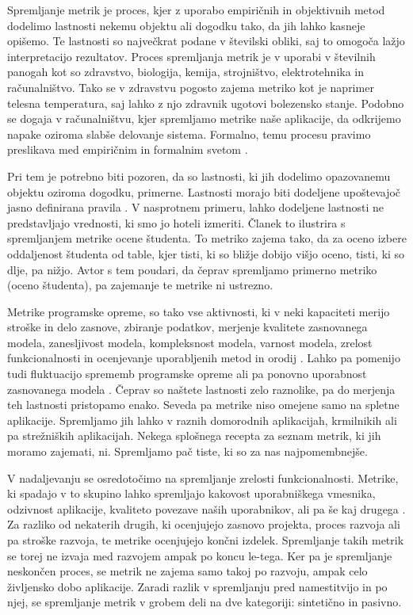 \documentclass[a4paper, 12pt]{book}
\begin{document}
Spremljanje metrik je proces, kjer z uporabo empiričnih in objektivnih metod dodelimo lastnosti nekemu objektu ali dogodku tako, da jih lahko kasneje opišemo. Te lastnosti so največkrat podane v številski obliki, saj to omogoča lažjo interpretacijo rezultatov. Proces spremljanja metrik je v uporabi v številnih panogah kot so zdravstvo, biologija, kemija, strojništvo, elektrotehnika in računalništvo. Tako se v zdravstvu pogosto zajema metriko kot je naprimer telesna temperatura, saj lahko z njo zdravnik ugotovi bolezensko stanje. Podobno se dogaja v računalništvu, kjer spremljamo metrike naše aplikacije, da odkrijemo napake oziroma slabše delovanje sistema. Formalno, temu procesu pravimo preslikava med empiričnim in formalnim svetom \cite{se_metrics}.

Pri tem je potrebno biti pozoren, da so lastnosti, ki jih dodelimo opazovanemu objektu oziroma dogodku, primerne. Lastnosti morajo biti dodeljene upoštevajoč jasno definirana pravila \cite{software_metrics}. V nasprotnem primeru, lahko dodeljene lastnosti ne predstavljajo vrednosti, ki smo jo hoteli izmeriti. Članek \cite{se_metrics} to ilustrira s spremljanjem metrike ocene študenta. To metriko zajema tako, da za oceno izbere oddaljenost študenta od table, kjer tisti, ki so bližje dobijo višjo oceno, tisti, ki so dlje, pa nižjo. Avtor s tem poudari, da čeprav spremljamo primerno metriko (oceno študenta), pa zajemanje te metrike ni ustrezno.

Metrike programske opreme, so tako vse aktivnosti, ki v neki kapaciteti merijo stroške in delo zasnove, zbiranje podatkov, merjenje kvalitete zasnovanega modela, zanesljivost modela, kompleksnost modela, varnost modela, zrelost funkcionalnosti in ocenjevanje uporabljenih metod in orodij \cite{software_metrics} \cite{usefulness_soft_metrics} \cite{assigning_weights_quality} \cite{fault_prediction_metrics}. Lahko pa pomenijo tudi fluktuacijo sprememb programske opreme ali pa ponovno uporabnost zasnovanega modela \cite{metrics_fluctuation} \cite{reusability_metrics}. Čeprav so naštete lastnosti zelo raznolike, pa do merjenja teh lastnosti pristopamo enako. Seveda pa metrike niso omejene samo na spletne aplikacije. Spremljamo jih lahko v raznih domorodnih aplikacijah, krmilnikih ali pa strežniških aplikacijah. Nekega splošnega recepta za seznam metrik, ki jih moramo zajemati, ni. Spremljamo pač tiste, ki so za nas najpomembnejše.

V nadaljevanju se osredotočimo na spremljanje zrelosti funkcionalnosti. Metrike, ki spadajo v to skupino lahko spremljajo kakovost uporabniškega vmesnika, odzivnost aplikacije, kvaliteto povezave naših uporabnikov, ali pa še kaj drugega \cite{wba_quality}. Za razliko od nekaterih drugih, ki ocenjujejo zasnovo projekta, proces razvoja ali pa stroške razvoja, te metrike ocenjujejo končni izdelek. Spremljanje takih metrik se torej ne izvaja med razvojem ampak po koncu le-tega. Ker pa je spremljanje neskončen proces, se metrik ne zajema samo takoj po razvoju, ampak celo življensko dobo aplikacije. Zaradi razlik v spremljanju pred namestitvijo in po njej, se spremljanje metrik v grobem deli na dve kategoriji: sintetično in pasivno.
\end{document}
